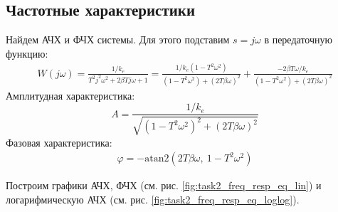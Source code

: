 \subsection{Частотные характеристики}
Найдем АЧХ и ФЧХ системы. Для этого подставим $s = j\omega$ в передаточную функцию:
\begin{eqnarray}
    W(j\omega) =  \frac{1/k_e}{T^2j^2\omega^2 + 2\beta Tj\omega + 1} = \frac{1/k_e(1 - T^2\omega^2)}{(1 - T^2\omega^2) + (2T\beta\omega)^2} + \frac{-2\beta T\omega/k_e}{(1 - T^2\omega^2) + (2T\beta\omega)^2}
\end{eqnarray}
Амплитудная характеристика:
\begin{equation}
    A = \frac{1/k_e}{\sqrt{(1 - T^2\omega^2)^2 + (2T\beta\omega)^2}}
\end{equation}
Фазовая характеристика:
\begin{eqnarray}
    \varphi = -\text{atan2}\left(2T\beta\omega,~1 - T^2\omega^2\right)
\end{eqnarray}

Построим графики АЧХ, ФЧХ (см. рис. \ref{fig:task2_freq_resp_eq_lin}) и логарифмическую АЧХ (см. рис. \ref{fig:task2_freq_resp_eq_loglog}).

